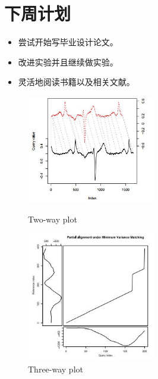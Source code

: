 \documentclass{ctexart}
\begin{document}
\section*{下周计划}
\begin{itemize}
  \item 尝试开始写毕业设计论文。
  \item 改进实验并且继续做实验。
  \item 灵活地阅读书籍以及相关文献。
\end{itemize}

\begin{figure}
    \centering
    \begin{minipage}[t]{0.4\linewidth}
    \centering
    \includegraphics[width=2.2in]{1.jpg}
    \caption{Two-way plot}
    \label{fig:side:a}
    \end{minipage}%
    \begin{minipage}[t]{0.4\linewidth}
    \centering
    \includegraphics[width=2.2in]{2.jpg}
    \caption{Three-way plot}
    \label{fig:side:b}
    \end{minipage}
\end{figure}
\end{document}
